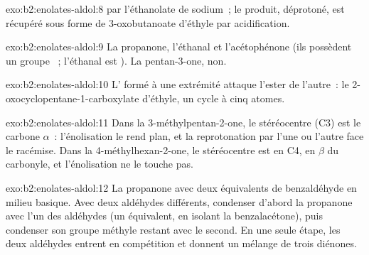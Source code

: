 \begin{solution}{exo:b2:enolates-aldol:8}
 par l'éthanolate de sodium~; le produit, déprotoné, est
récupéré sous forme de 3-oxobutanoate d'éthyle par acidification.
\end{solution}

\begin{solution}{exo:b2:enolates-aldol:9}
La propanone, l'éthanal et l'acétophénone (ils possèdent un groupe ~; l'éthanal est ).
La pentan-3-one, non.
\end{solution}

\begin{solution}{exo:b2:enolates-aldol:10}
L' formé à une extrémité attaque l'ester de l'autre~: le 2-oxocyclopentane-1-carboxylate d'éthyle,
un cycle à cinq atomes.
\end{solution}

\begin{solution}{exo:b2:enolates-aldol:11}
Dans la 3-méthylpentan-2-one, le stéréocentre (C3) est le carbone $\alpha$~: l'énolisation le rend plan,
et la reprotonation par l'une ou l'autre face le racémise. Dans la 4-méthylhexan-2-one, le stéréocentre
est en C4, en $\beta$ du carbonyle, et l'énolisation ne le touche pas.
\end{solution}

\begin{solution}{exo:b2:enolates-aldol:12}
La propanone avec deux équivalents de benzaldéhyde en milieu basique. Avec deux aldéhydes différents,
condenser d'abord la propanone avec l'un des aldéhydes (un équivalent, en isolant la benzalacétone), puis
condenser son groupe méthyle restant avec le second. En une seule étape, les deux aldéhydes entrent en
compétition et donnent un mélange de trois diénones.
\end{solution}

